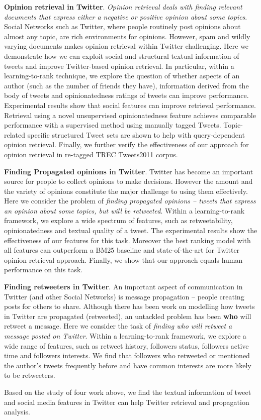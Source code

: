\begin{eabstract}
\textbf{Opinion retrieval in Twitter}. \emph{Opinion retrieval deals with finding relevant documents that
express either a negative or positive opinion about some topics}.  
Social Networks such as Twitter, where people routinely post
opinions about almost any topic, are rich environments for opinions. 
However, spam and wildly varying documents makes opinion retrieval
within Twitter challenging. Here we demonstrate how we can exploit 
social  and structural textual information of tweets and 
improve Twitter-based opinion retrieval.  In particular, within 
 a learning-to-rank
technique, we explore the question of whether aspects of an author
(such as the number of friends they have), information derived from
the body of tweets and opinionatedness ratings of tweets can improve performance.
 Experimental results show that social features can improve retrieval
 performance.  Retrieval using a novel unsupervised opinionatedness
feature achieves comparable
performance with a supervised method using manually tagged
Tweets. Topic-related specific structured Tweet
sets are shown to help with query-dependent opinion retrieval. Finally, we
further verify the  effectiveness of our approach for opinion retrieval in re-tagged TREC Tweets2011 corpus.

\textbf{Finding Propagated opinions in Twitter}. Twitter has become an important source for people to collect opinions to make decisions. However the amount and the variety of opinions constitute the major challenge to using them effectively. Here we consider the problem of \emph{finding propagated opinions -- tweets that express an opinion about some topics, but will be retweeted}. Within a learning-to-rank framework, we explore a wide spectrum of features, such as retweetability, opinionatedness and textual quality of a tweet. The experimental results show the effectiveness of our features for this task. Moreover the best ranking model with all features can outperform a BM25 baseline and state-of-the-art for Twitter opinion retrieval approach. Finally, we show that our approach equals human performance on this task.

\textbf{Finding retweeters in Twitter}. An important aspect of communication in Twitter (and other Social Networks) is
message propagation -- people creating posts for others to share.
Although there has been work on modelling how tweets
in Twitter are propagated (retweeted), an
untackled problem has been \textbf{who} will retweet a message. Here 
we consider the task of \emph{finding who will retweet a message posted on Twitter}. Within a learning-to-rank framework, we explore 
a wide range of features, such as retweet history, followers status, followers active time and followers interests. We find that 
followers who retweeted or mentioned the author's tweets frequently before and have common interests are more likely to be 
retweeters.

Based on the study of four work above, we find the textual information of tweet and social media features in Twitter can help Twitter retrieval and propagation analysis.
\end{eabstract}

